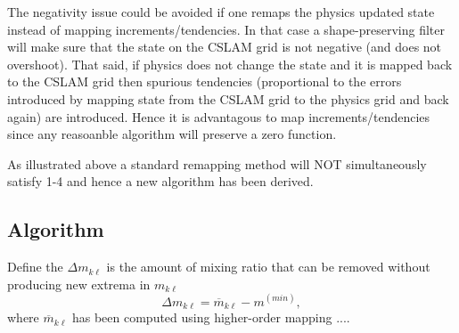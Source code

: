 The negativity issue could be avoided if one remaps the physics updated state instead of mapping increments/tendencies. In that case a shape-preserving filter will make sure that the state on the CSLAM grid is not negative (and does not overshoot). That said, if physics does not change the state and it is mapped back to the CSLAM grid then spurious tendencies (proportional to the errors introduced by mapping state from the CSLAM grid to the physics grid and back again) are introduced. Hence it is advantagous to map increments/tendencies since any reasoanble algorithm will preserve a zero function.








As illustrated above a standard remapping method will NOT simultaneously satisfy 1-4 and hence a new algorithm has been derived.
\subsection{Algorithm}
{\color{red}{mention that the reason we map increment and not state is to avoid spurious increments solely due to interpolation errors, i.e. zero increment on physics grid would transform into increments on the CSLAM grid.}}
Define the $\Delta m_{k\ell}$ is the amount of mixing ratio that can be removed without producing new extrema in $m_{k\ell}$
\begin{equation}
\Delta m_{k\ell}=\overline{m}_{k\ell}-m^{(min)},
\end{equation}
where $\overline{m}_{k\ell}$ has been computed using higher-order mapping ....
{\color{red}{mention why the problem is well-posed}}
